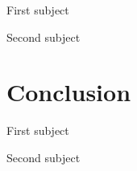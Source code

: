 \documentclass{beamer}
\begin{document}

\begin{frame}{First subject}

\end{frame}

\begin{frame}{Second subject}

\end{frame}


\section{Conclusion}


\begin{frame}{First subject}

\end{frame}

\begin{frame}{Second subject}

\end{frame}
\end{document}
